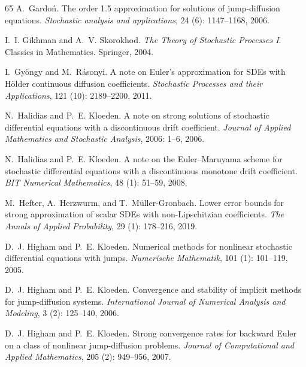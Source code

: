 \documentclass[11pt,a4paper]{article}
\numberwithin{equation}{section}
\theoremstyle{definition}
\begin{document}
{\begin{thebibliography}{65}
A.~Gardo{\'n}.
\newblock The order 1.5 approximation for solutions of jump-diffusion equations.
\newblock \emph{Stochastic analysis and applications}, 24 (6): 1147--1168, 2006.

I.~I. Gikhman and A.~V. Skorokhod.
\newblock \emph{The Theory of Stochastic Processes I}.
\newblock Classics in Mathematics. Springer, 2004.

I.~Gy\"ongy and M.~R\'asonyi.
\newblock A note on {E}uler's approximation for {SDE}s with {H}ölder continuous diffusion coefficients.
\newblock \emph{Stochastic Processes and their Applications}, 121 (10): 2189--2200, 2011.

N.~Halidias and P.~E. Kloeden.
\newblock A note on strong solutions of stochastic differential equations with a discontinuous drift coefficient.
\newblock \emph{Journal of Applied Mathematics and Stochastic Analysis}, 2006: 1--6, 2006.

N.~Halidias and P.~E. Kloeden.
\newblock A note on the {E}uler–{M}aruyama scheme for stochastic differential equations with a discontinuous monotone drift coefficient.
\newblock \emph{BIT Numerical Mathematics}, 48 (1): 51--59, 2008.

M.~Hefter, A.~Herzwurm, and T.~M{\"u}ller-Gronbach.
\newblock Lower error bounds for strong approximation of scalar {SDE}s with non-{L}ipschitzian coefficients.
\newblock \emph{The Annals of Applied Probability}, 29 (1): 178--216, 2019.

D.~J. Higham and P.~E. Kloeden.
\newblock Numerical methods for nonlinear stochastic differential equations with jumps.
\newblock \emph{Numerische Mathematik}, 101 (1): 101--119, 2005.

D.~J. Higham and P.~E. Kloeden.
\newblock Convergence and stability of implicit methods for jump-diffusion systems.
\newblock \emph{International Journal of Numerical Analysis and Modeling}, 3 (2): 125--140, 2006.

D.~J. Higham and P.~E. Kloeden.
\newblock Strong convergence rates for backward {E}uler on a class of nonlinear jump-diffusion problems.
\newblock \emph{Journal of Computational and Applied Mathematics}, 205 (2): 949--956, 2007.


\end{thebibliography}}
\end{document}
